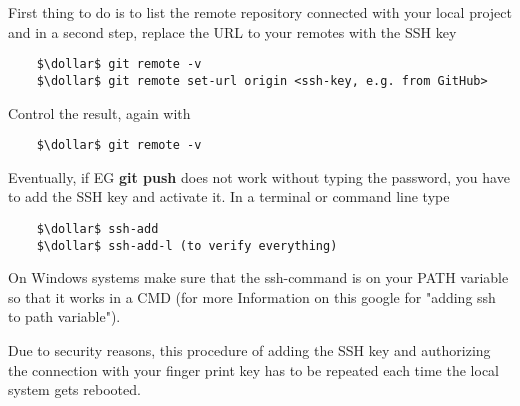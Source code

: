 

First thing to do is to list the remote repository connected with your local project and in a second step, replace the URL to your remotes 
with the SSH key

\begin{lstlisting}
	$\dollar$ git remote -v
	$\dollar$ git remote set-url origin <ssh-key, e.g. from GitHub>
\end{lstlisting}
Control the result, again with
\begin{lstlisting}
	$\dollar$ git remote -v
\end{lstlisting}
Eventually, if \ac{EG} \textbf{git push} does not work without typing the password, you have to add the SSH key and activate it. In a terminal or command line type
\begin{lstlisting}
	$\dollar$ ssh-add
	$\dollar$ ssh-add-l (to verify everything)
\end{lstlisting}
On Windows  systems make sure that the ssh-command is on your PATH variable so that it works in a CMD (for more Information on this google for "adding ssh to path variable").

Due to security reasons, this procedure of adding the SSH key and authorizing the connection with your finger print key has to be repeated each time the local system 
gets rebooted. 









